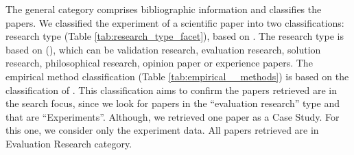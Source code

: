 \begin{table}[h]
	\captionsetup{width=13.2cm}%
    \end{table}

The general category comprises bibliographic information and classifies the papers. We classified the  experiment of a scientific paper into two classifications: research type (Table \ref{tab:research_type_facet}), based on . The research type is based on \citeauthor{Petersen2008} (\citeyear{Petersen2008}), which can be validation research, evaluation research, solution research, philosophical research, opinion paper or experience papers. The empirical method classification (Table \ref{tab:empirical__methods}) is based on the classification of \cite{Ampatzoglou2010}. This classification aims to confirm the papers retrieved are in the search focus, since we look for papers in the ``evaluation research'' type and that are ``Experiments''. Although, we retrieved one paper as a Case Study. For this one, we consider only the experiment data. All papers retrieved are in Evaluation Research category. 

